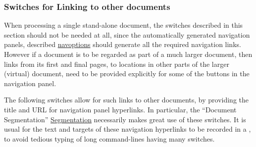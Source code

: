 \subsubsection{Switches for Linking to other documents\label{otherdocs}}
%
When processing a single stand-alone document, the switches described in this
section should not be needed at all, since the automatically generated navigation panels, 
described \hyperref{on the previous page}{in Section~}{, }{navoptions}
should generate all the required navigation links.
However if a document is to be regarded as part of a much larger document,
then links from its first and final pages, to locations in other parts
of the larger (virtual) document, 
need to be provided explicitly for some of the buttons in the navigation panel.

The following switches allow for such links to other documents,
by providing the title and URL for navigation panel hyperlinks.
In particular, the ``Document Segmentation''
\hyperref{feature}{feature of Section~}{}{Segmentation} 
necessarily makes great use of these switches.
It is usual for the text and targets of these navigation hyperlinks
to be recorded in a , 
to avoid tedious typing of long command-lines having many switches.

